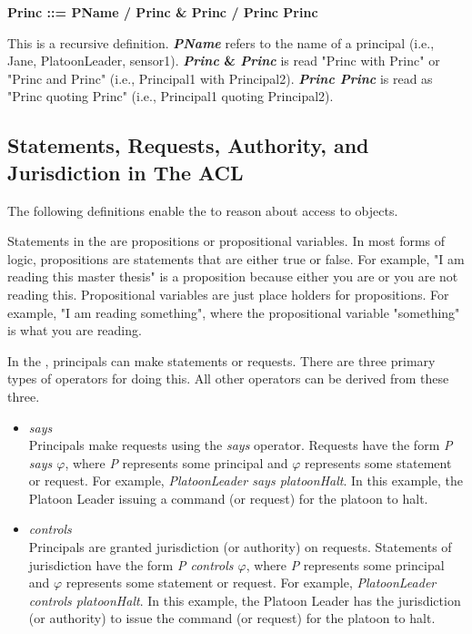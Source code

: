 \documentclass[../../main/main.tex]{subfiles}
\begin{document}
\begin{center}
\textbf{Princ ::= PName / Princ \& Princ / Princ \textbar  Princ}
\end{center}

This is a recursive definition. \textbf{\textit{PName}} refers to the name of a principal (i.e., Jane, PlatoonLeader, sensor1).  \textbf{\textit{Princ} \& \textit{Princ}} is read "Princ with Princ" or "Princ and Princ" (i.e., Principal1 with Principal2). \textbf{\textit{Princ \textbar  Princ}} is read as "Princ quoting Princ" (i.e., Principal1 quoting Principal2).


\subsection{Statements, Requests, Authority, and Jurisdiction in The ACL}\label{ssec:statementsacl}
The following definitions enable the  to reason about access to objects. 


Statements in the  are propositions or propositional variables.  In most forms of logic, propositions are statements that are either true or false.  For example, "I am reading this master thesis" is a proposition because either you are or you are not reading this.  Propositional variables are just place holders for propositions.  For example, "I am reading something", where the propositional variable "something" is what you are reading.

In the , principals can make statements or requests.  There are three primary types of operators for doing this.  All other operators can be derived from these three.  

\begin{itemize}
\item{\textit{says}} \\
Principals make requests using the \textit{says} operator.  Requests have the form \textit{P says $\varphi$},  where \textit{P} represents some principal and \textit{$\varphi$} represents some statement or request.  For example, \textit{PlatoonLeader says platoonHalt}.  In this example, the Platoon Leader issuing a command (or request) for the platoon to halt.  
\item{\textit{controls}} \\
Principals are granted jurisdiction (or authority) on requests.  Statements of jurisdiction have the form \textit{P controls $\varphi$},  where \textit{P} represents some principal and \textit{$\varphi$} represents some statement or request.  For example, \textit{PlatoonLeader controls platoonHalt}.  In this example, the Platoon Leader has the jurisdiction (or authority) to issue the command (or request) for the platoon to halt. 
\end{itemize}
\end{document}
